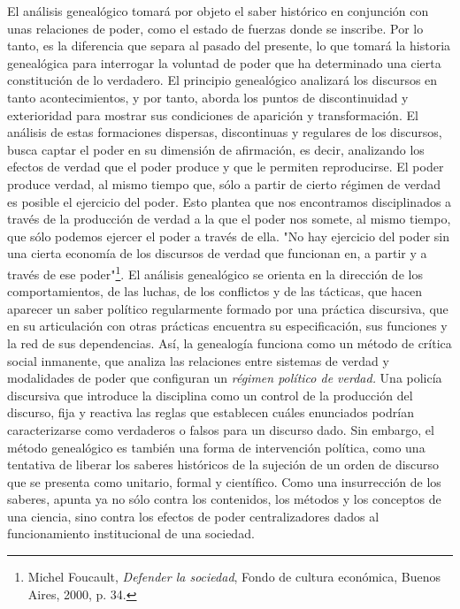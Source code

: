 \documentclass{book}
\begin{document}
El análisis genealógico tomará por objeto el saber histórico en
conjunción con unas relaciones de poder, como el estado de fuerzas donde
se inscribe. Por lo tanto, es la diferencia que separa al pasado del
presente, lo que tomará la historia genealógica para interrogar la
voluntad de poder que ha determinado una cierta constitución de lo
verdadero. El principio genealógico analizará los discursos en tanto
acontecimientos, y por tanto, aborda los puntos de discontinuidad y
exterioridad para mostrar sus condiciones de aparición y transformación.
El análisis de estas formaciones dispersas, discontinuas y regulares de
los discursos, busca captar el poder en su dimensión de afirmación, es
decir, analizando los efectos de verdad que el poder produce y que le
permiten reproducirse. El poder produce verdad, al mismo tiempo que,
sólo a partir de cierto régimen de verdad es posible el ejercicio del
poder. Esto plantea que nos encontramos disciplinados a través de la
producción de verdad a la que el poder nos somete, al mismo tiempo, que
sólo podemos ejercer el poder a través de ella. "No hay ejercicio del
poder sin una cierta economía de los discursos de verdad que funcionan
en, a partir y a través de ese poder"\footnote{Michel Foucault,
  \emph{Defender la sociedad}, Fondo de cultura económica, Buenos Aires,
  2000, p. 34.}. El análisis genealógico se orienta en la dirección de
los comportamientos, de las luchas, de los conflictos y de las tácticas,
que hacen aparecer un saber político regularmente formado por una
práctica discursiva, que en su articulación con otras prácticas
encuentra su especificación, sus funciones y la red de sus dependencias.
Así, la genealogía funciona como un método de crítica social inmanente,
que analiza las relaciones entre sistemas de verdad y modalidades de
poder que configuran un \emph{régimen político de verdad.} Una policía
discursiva que introduce la disciplina como un control de la producción
del discurso, fija y reactiva las reglas que establecen cuáles
enunciados podrían caracterizarse como verdaderos o falsos para un
discurso dado. Sin embargo, el método genealógico es también una forma
de intervención política, como una tentativa de liberar los saberes
históricos de la sujeción de un orden de discurso que se presenta como
unitario, formal y científico. Como una insurrección de los saberes,
apunta ya no sólo contra los contenidos, los métodos y los conceptos de
una ciencia, sino contra los efectos de poder centralizadores dados al
funcionamiento institucional de una sociedad.
\end{document}
